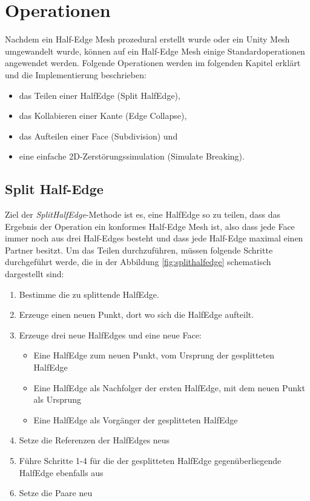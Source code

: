 \section{Operationen}
Nachdem ein Half-Edge Mesh prozedural erstellt wurde oder ein Unity Mesh umgewandelt wurde, k\"onnen auf ein Half-Edge Mesh einige Standardoperationen angewendet werden. Folgende Operationen werden im folgenden Kapitel erkl\"art und die Implementierung beschrieben:
\begin{itemize}
	\item das Teilen einer HalfEdge (Split HalfEdge),
	\item das Kollabieren einer Kante (Edge Collapse),
	\item das Aufteilen einer Face (Subdivision) und
	\item eine einfache 2D-Zerst\"orungssimulation (Simulate Breaking).
\end{itemize}

\subsection{Split Half-Edge}
Ziel der \textit{SplitHalfEdge}-Methode ist es, eine HalfEdge so zu teilen, dass das Ergebnis der Operation ein konformes Half-Edge Mesh ist, also dass jede Face immer noch aus drei Half-Edges besteht und dass jede Half-Edge maximal einen Partner besitzt. Um das Teilen durchzuf\"uhren, m\"ussen folgende Schritte durchgef\"uhrt werde, die in der Abbildung \ref{fig:splithalfedge} schematisch dargestellt sind:
\begin{enumerate}
	\item Bestimme die zu splittende HalfEdge.
	\item Erzeuge einen neuen Punkt, dort wo sich die HalfEdge aufteilt.
	\item Erzeuge drei neue HalfEdges und eine neue Face:
	\begin{itemize}
		\item Eine HalfEdge zum neuen Punkt, vom Ursprung der gesplitteten HalfEdge
		\item Eine HalfEdge als Nachfolger der ersten HalfEdge, mit dem neuen Punkt als Ursprung 
		\item Eine HalfEdge als Vorg\"anger der gesplitteten HalfEdge
	\end{itemize}
	\item Setze die Referenzen der HalfEdges neus
	\item F\"uhre Schritte 1-4 f\"ur die der gesplitteten HalfEdge gegen\"uberliegende HalfEdge ebenfalls aus
	\item Setze die Paare neu
\end{enumerate}

